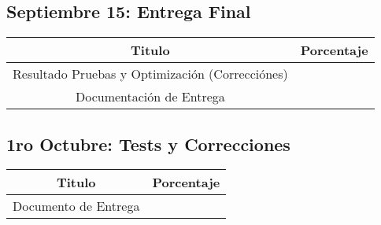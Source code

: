 \subsection{Septiembre 15: Entrega Final}

\begin{center}
\begin{tabular}{|c|c|}
\hline 
Titulo & Porcentaje \\ \hline
\hline
Resultado Pruebas y Optimización (Correcciónes) & \\ \hline
Documentación de Entrega & \\ \hline
\end{tabular}
\end{center}

\subsection{1ro Octubre: Tests y Correcciones}

\begin{center}
\begin{tabular}{|c|c|}
\hline 
Titulo & Porcentaje \\ \hline
\hline
Documento de Entrega & \\ \hline
\end{tabular}
\end{center}